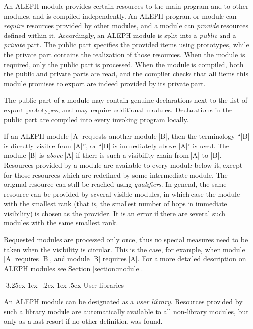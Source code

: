 \documentclass[titlepage]{article}
\makeatletter
\newcommand\A{\textsf{ALEPH}}
\renewcommand\subsection{%
\@startsection{subsection}{2}{\z@}%
   {-3.25ex\@plus -1ex \@minus -.2ex}%
   {1ex \@plus .5ex}%
   {\normalfont\normalsize\bfseries}}
\makeatother
\begin{document}
An \A{} module provides certain resources to the main program and to other
modules, and is compiled independently. An \A{} program or module
can \emph{require} resources provided by other modules, and a module can
\emph{provide} resources defined within it. Accordingly, an \A{} module is
split into a \emph{public} and a \emph{private} part. The public part
specifies the provided items using prototypes, while the private part
contains the realization of those resources. When the module is required,
only the public part is processed. When the module is compiled, both the
public and private parts are read, and the compiler checks that all
items this module promises to export are indeed provided by its private
part.

The public part of a module may contain genuine declarations next to the
list of export prototypes, and may require additional modules. Declarations
in the public part are compiled into every invoking program locally.

If an \A{} module \pp|A| requests another module \pp|B|,
then the terminology ``\pp|B| is directly visible from \pp|A|'', or
``\pp|B| is immediately above \pp|A|'' is used. The module \pp|B|
is \emph{above} \pp|A| if there is such a visibility chain from \pp|A|
to \pp|B|. Resources provided by a module are available to every module
below it, except for those resources which are redefined by
some intermediate module. The original resource can still be reached using
\emph{qualifiers}. In general, the same resource can be provided by several
visible modules, in which case the module with the smallest rank (that is,
the smallest number of hops in immediate visibility) is chosen as the
provider. It is an error if there are several such modules with the same
smallest rank.

Requested modules are processed only once, thus no special measures need to be
taken when the visibility is circular. This is the case, for example, when
module \pp|A| requires \pp|B|, and module \pp|B| requires
\pp|A|. For a more detailed description on \A{} modules see Section
\ref{section:module}.
 
\subsection{User libraries}\label{subsec:user-library}

An \A{} module can be designated as a \emph{user library}. Resources
provided by such a library module are automatically available to all
non-library modules,
but only as a last resort if no other definition was found.
\end{document}
